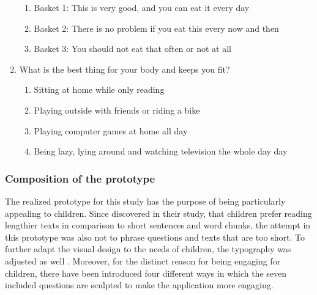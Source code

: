 \begin{enumerate}
\begin{enumerate}
        \item Basket 1: This is very good, and you can eat it every day
        \item Basket 2: There is no problem if you eat this every now and then
        \item Basket 3: You should not eat that often or not at all
    \end{enumerate}
    \item What is the best thing for your body and keeps you fit?
    \begin{enumerate}
        \item Sitting at home while only reading 
        \item Playing outside with friends or riding a bike
        \item Playing computer games at home all day 
        \item Being lazy, lying around and watching television the whole day day
    \end{enumerate}
\end{enumerate}

\subsubsection{Composition of the prototype}
The realized prototype for this study has the purpose of being particularly appealing to children. Since \textcite{sharmin2012effect} discovered in their study, that children prefer reading lengthier texts in comparison to short sentences and word chunks, the attempt in this prototype was also not to phrase questions and texts that are too short.
To further adapt the visual design to the needs of children, the typography was adjusted as well \autocite{adattil2018effects}.
Moreover, for the distinct reason for being engaging for children, there have been introduced four different ways in which the seven included questions are sculpted to make the application more engaging.

